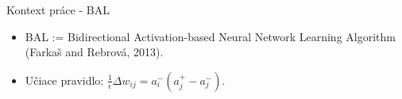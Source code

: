 \documentclass[xcolor=dvipsnames]{beamer}
\begin{document}
\newcommand{\Bx}{{\bf x}}
\newcommand{\By}{{\bf y}}
\newcommand{\Bh}{{\bf h}}
\newcommand{\Bw}{{\bf w}}
\newcommand{\Bc}{{\bf c}}

\begin{frame}{Kontext práce - BAL}
  \begin{itemize}
    \item BAL := Bidirectional Activation-based Neural Network Learning Algorithm (Farkaš and Rebrová, 2013).
    \item Učiace pravidlo: $ \frac{1}{\epsilon}\Delta w_{ij} = a_{i}^{-}(a_{j}^{+} - a_{j}^{-}). $
  \end{itemize}
  

\end{frame}
\end{document}
